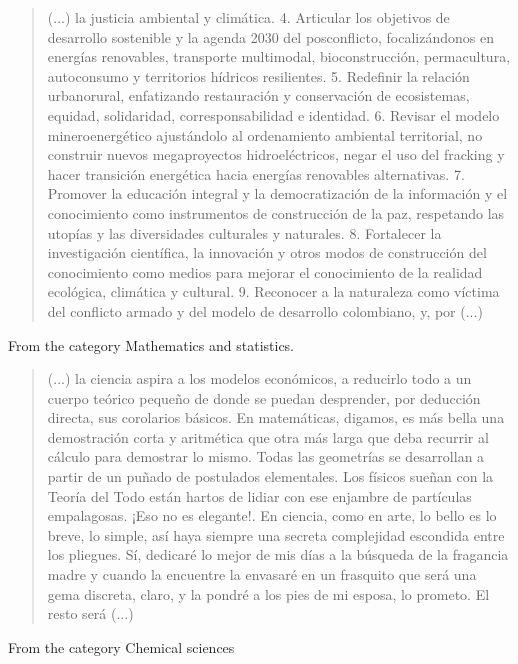\documentclass[12pt]{article}
\begin{document}
	\begin{quote}
		(...) la justicia ambiental y climática. 4. Articular los objetivos de desarrollo sostenible y la agenda 2030 del posconflicto, focalizándonos en energías renovables, transporte multimodal, bioconstrucción, permacultura, autoconsumo y territorios hídricos resilientes. 5. Redefinir la relación urbanorural, enfatizando restauración y conservación de ecosistemas, equidad, solidaridad, corresponsabilidad e identidad. 6. Revisar el modelo mineroenergético ajustándolo al ordenamiento ambiental territorial, no construir nuevos megaproyectos hidroeléctricos, negar el uso del fracking y hacer transición energética hacia energías renovables alternativas. 7. Promover la educación integral y la democratización de la información y el conocimiento como instrumentos de construcción de la paz, respetando las utopías y las diversidades culturales y naturales. 8. Fortalecer la investigación científica, la innovación y otros modos de construcción del conocimiento como medios para mejorar el conocimiento de la realidad ecológica, climática y cultural. 9. Reconocer a la naturaleza como víctima del conflicto armado y del modelo de desarrollo colombiano, y, por (...)
	\end{quote}
	
	From the category Mathematics and statistics.
	
	\begin{quote}
		(...) la ciencia aspira a los modelos económicos, a reducirlo todo a un cuerpo teórico pequeño de donde se puedan desprender, por deducción directa, sus corolarios básicos. En matemáticas, digamos, es más bella una demostración corta y aritmética que otra más larga que deba recurrir al cálculo para demostrar lo mismo. Todas las geometrías se desarrollan a partir de un puñado de postulados elementales. Los físicos sueñan con la Teoría del Todo están hartos de lidiar con ese enjambre de partículas empalagosas. ¡Eso no es elegante!. En ciencia, como en arte, lo bello es lo breve, lo simple, así haya siempre una secreta complejidad escondida entre los pliegues. Sí, dedicaré lo mejor de mis días a la búsqueda de la fragancia madre y cuando la encuentre la envasaré en un frasquito que será una gema discreta, claro, y la pondré a los pies de mi esposa, lo prometo. El resto será (...)
	\end{quote}
	
	From the category Chemical sciences
	
\end{document}
